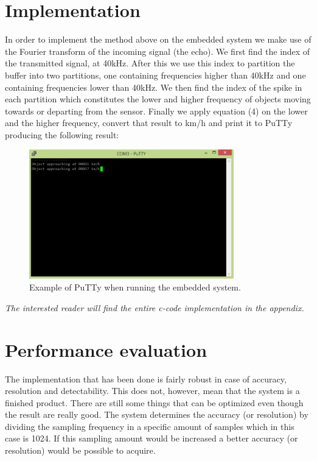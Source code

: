 \documentclass[a4paper,11pt]{article}
\begin{document}
\section{Implementation}
In order to implement the method above on the embedded system we make use of the Fourier transform of the incoming signal (the echo). We first find the index of the transmitted signal, at 40kHz. After this we use this index to partition the buffer into two partitions, one containing frequencies higher than 40kHz and one containing frequencies lower than 40kHz.
We then find the index of the spike in each partition which constitutes the lower and higher frequency of objects moving towards or departing from the sensor.
Finally we apply equation (4) on the lower and the higher frequency, convert that result to km/h and print it to PuTTy producing the following result:\\
\begin{figure}[!ht]
  \centering
  \includegraphics[width=3.5in]{putty.png}
  \caption{Example of PuTTy when running the embedded system.}
  \label{putty}
\end{figure}
\textit{The interested reader will find the entire c-code implementation in the appendix.}

\section{Performance evaluation}

The implementation that has been done is fairly robust in case of accuracy, resolution and detectability. This does not, however, mean that the system is a finished product. There are still some things that can be optimized even though the result are really good. 
The system determines the accuracy (or resolution) by dividing the sampling frequency in a specific amount of samples which in this case is 1024. If this sampling amount would be increased a better accuracy (or resolution) would be possible to acquire.
\end{document}
